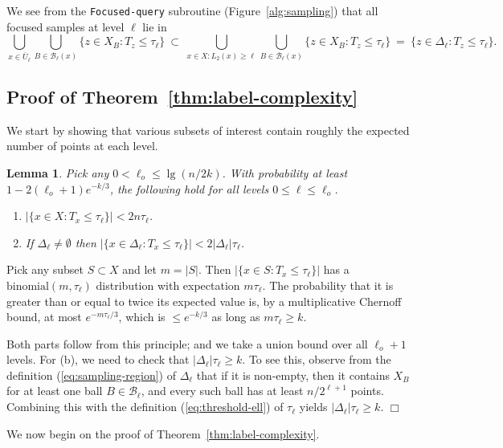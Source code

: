 \documentclass{article}
\def\B{{\mathcal B}}
\newtheorem{lemma}[thm]{Lemma}
\newenvironment{proof}{\noindent {\sc Proof:}}{$\Box$ \medskip}
\begin{document}
We see from the {\tt Focused-query} subroutine (Figure~\ref{alg:sampling}) that all focused samples at level $\ell$ lie in
$$
\bigcup_{x \in \overline{U}_\ell} \bigcup_{B \in \B_\ell(x)} \{z \in X_B: T_z \leq \tau_\ell \}
\ 
\subset 
\ 
\bigcup_{x \in X: L_2(x) \geq \ell} \bigcup_{B \in \B_\ell(x)} \{z \in X_B: T_z \leq \tau_\ell \}
\ 
=
\ 
\{z \in \Delta_\ell: T_z \leq \tau_\ell \}.
$$

\subsection{Proof of Theorem~\ref{thm:label-complexity}}

We start by showing that various subsets of interest contain roughly the expected number of points at each level.
\begin{lemma}
Pick any $0 < \ell_o \leq \lg (n/2k)$. With probability at least $1-2(\ell_o+1)e^{-k/3}$, the following hold for all levels $0 \leq \ell \leq \ell_o$.
\begin{enumerate}
\item[(a)] $|\{x \in X: T_x \leq \tau_\ell\}| < 2 n \tau_\ell$.
\item[(b)] If $\Delta_\ell \neq \emptyset$ then $|\{x \in \Delta_{\ell}: T_x \leq \tau_\ell\}| < 2 |\Delta_\ell| \tau_\ell$.
\end{enumerate}
\label{lemma:level-distribution}
\end{lemma}
\begin{proof} 
Pick any subset $S \subset X$ and let $m = |S|$. Then $|\{x \in S: T_x \leq \tau_\ell\}|$ has a $\mbox{binomial}(m, \tau_\ell)$ distribution with expectation $m \tau_\ell$. The probability that it is greater than or equal to twice its expected value is, by a multiplicative Chernoff bound, at most $e^{-m \tau_{\ell}/3}$, which is $\leq e^{-k/3}$ as long as $m \tau_\ell \geq k$.

Both parts follow from this principle; and we take a union bound over all $\ell_o + 1$ levels. For (b), we need to check that $|\Delta_\ell| \tau_\ell \geq k$. To see this, observe from the definition (\ref{eq:sampling-region}) of $\Delta_\ell$ that if it is non-empty, then it contains $X_B$ for at least one ball $B \in \B_\ell$, and every such ball has at least $n/2^{\ell+1}$ points. Combining this with the definition (\ref{eq:threshold-ell}) of $\tau_\ell$ yields $|\Delta_\ell| \tau_\ell \geq k$.
\end{proof}

We now begin on the proof of Theorem~\ref{thm:label-complexity}.
\end{document}
